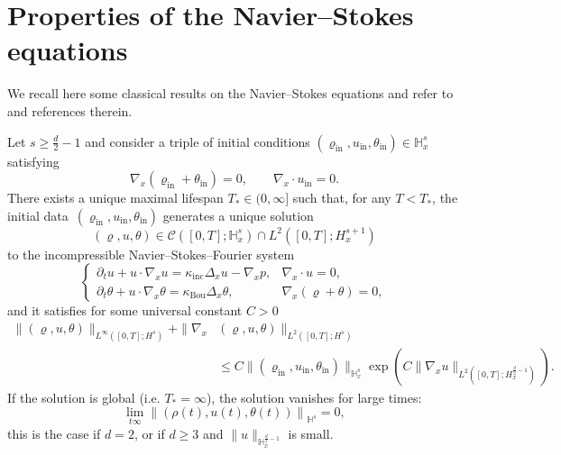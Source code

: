 \documentclass[AHL,Unicode,longabstracts,published]{cedram}
\newcommand{\ini}{\mathrm{in}}
\newcommand{\Inc}{\mathrm{inc}}
\newcommand{\Bou}{\mathrm{Bou}}
\newcommand{\bbH}{\mathbb{H}}
\newcommand{\CC}{\mathcal{C}}
\renewcommand*\le{\leqslant}
\renewcommand*\ge{\geqslant}
\begin{document}
\section{Properties of the Navier--Stokes equations}\label{sec:N-S}

We recall here some classical results on the Navier--Stokes equations and refer to~\cite{R2016} and references therein.

\begin{theo}\label{thm:cauchy_NSF}
Let $s \ge \frac{d}{2} - 1$ and consider a triple of initial conditions $(\varrho_\ini, u_\ini, \theta_\ini) \in \bbH^s_x$ satisfying
\[
\nabla_x (\varrho_\ini + \theta_\ini) = 0, \qquad \nabla_x \cdot u_\ini = 0.
\]
There exists a unique maximal lifespan $T_* \in (0, \infty]$ such that, for any $T < T_*$, the initial data~$(\varrho_\ini, u_\ini, \theta_\ini)$ generates a unique solution
\[
(\varrho, u, \theta) \in \CC\left([0, T] ; \bbH^s_x\right) \cap L^2\left([0, T] ; H^{s+1}_x \right)
\]
to the incompressible Navier--Stokes--Fourier system
\begin{equation}\label{eq:NSF}
\begin{cases}
\partial_t u + u \cdot \nabla_x u = \kappa_\Inc \Delta_x u - \nabla_x p, & \nabla_x \cdot u = 0,\\
\partial_t \theta + u \cdot \nabla_x \theta = \kappa_\Bou \Delta_x \theta, & \nabla_x (\varrho + \theta) = 0,
\end{cases}
\end{equation}
and it satisfies for some universal constant $C >0$
\begin{align*}
\| (\varrho, u, \theta) \|_{ L^\infty \left([0, T] ; H^s \right) } + \| \nabla_x & (\varrho, u, \theta) \|_{ L^2 \left([0, T] ; H^s \right) } \\
& \le C \| (\varrho_\ini, u_\ini, \theta_\ini) \|_{\bbH^s_x } \exp\left(C \| \nabla_x u \|_{ L^2 \left([0, T] ; H^{\frac{d}{2}-1}_x \right) } \right).
\end{align*}
If the solution is global (i.e. $T_* = \infty$), the solution vanishes for large times:
\[
\lim_{t \infty} \left\| (\rho(t), u(t), \theta(t)) \right\|_{\bbH^s} = 0,
\]
this is the case if $d = 2$, or if $d \ge 3$ and $\| u \|_{ \bbH^{\frac{d}{2} - 1}_x }$ is small.
\end{theo}
\end{document}
